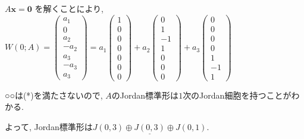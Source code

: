 \documentclass{jsarticle}
\begin{document}
$A\bm{x} = \bm{0}$ を解くことにより, $W(0;A) = \begin{pmatrix} a_1 \\ 0 \\ a_2 \\ -a_2 \\ a_3 \\ -a_3 \\ a_3 \end{pmatrix} = a_1 \begin{pmatrix} 1 \\ 0 \\ 0 \\ 0 \\ 0 \\ 0 \\ 0 \end{pmatrix} + a_2 \begin{pmatrix} 0 \\ 1 \\ -1 \\ 1 \\ 0 \\ 0 \\ 0 \end{pmatrix} + a_3 \begin{pmatrix} 0 \\ 0 \\ 0 \\ 0 \\ 1 \\ -1 \\ 1 \end{pmatrix}$

○○は(*)を満たさないので, $A$のJordan標準形は$1$次のJordan細胞を持つことがわかる.

よって, Jordan標準形は$\underline{J(0,3) \oplus J(0,3) \oplus J(0,1)}$.

\bigskip
\bigskip
\end{document}
